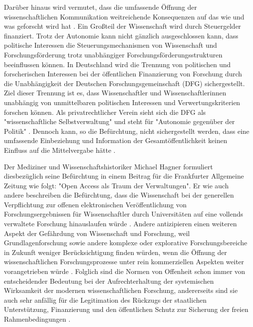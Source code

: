 Darüber hinaus wird vermutet, dass die umfassende Öffnung der wissenschaftlichen Kommunikation weitreichende Konsequenzen auf das wie und was geforscht wird hat \cite{Szczesny_2014} \cite{weingart_2005_wissenschaft}. Ein Großteil der Wissenschaft wird durch Steuergelder finanziert. Trotz der Autonomie kann nicht gänzlich ausgeschlossen kann, dass politische Interessen die Steuerungsmechanismen von Wissenschaft und Forschungsförderung trotz unabhängiger Forschungsförderungsstrukturen beeinflussen können. In Deutschland wird die Trennung von politischen und forscherischen Interessen bei der öffentlichen Finanzierung von Forschung durch die Unabhängigkeit der Deutschen Forschungsgemeinschaft (DFG) sichergestellt. Ziel dieser Trennung ist es, dass Wissenschaftler und Wissenschaftlerinnen unabhängig von unmittelbaren politischen Interessen und Verwertungskriterien forschen können. Als privatrechtlicher Verein sieht sich die DFG als "wissenschaftliche Selbstverwaltung" und steht für "Autonomie gegenüber der Politik" \cite{DFG_2011}. Dennoch kann, so die Befürchtung, nicht sichergestellt werden, dass eine umfassende Einbeziehung und Information der Gesamtöffentlichkeit keinen Einfluss auf die Mittelvergabe hätte \cite{weingart_2005_wissenschaft}.

Der Mediziner und Wissenschaftshistoriker Michael Hagner formuliert diesbezüglich seine Befürchtung in einem Beitrag für die Frankfurter Allgemeine Zeitung wie folgt: "Open Access als Traum der Verwaltungen". Er wie auch andere beschreiben die Befürchtung, dass die Wissenschaft bei der generellen Verpflichtung zur offenen elektronischen Veröffentlichung von Forschungsergebnissen für Wissenschaftler durch Universitäten auf eine vollends verwaltete Forschung hinauslaufen würde \cite{hagner_faz_2009}. Andere antizipieren einen weiteren Aspekt der Gefährdung von Wissenschaft und Forschung, weil Grundlagenforschung sowie andere komplexe oder explorative Forschungsbereiche in Zukunft weniger Berücksichtigung finden würden, wenn die Öffnung der wissenschaftlichen Forschungsprozesse unter rein kommerziellen Aspekten weiter vorangetrieben würde \cite{Szczesny_2014}. Folglich sind die Normen von Offenheit schon immer von entscheidender Bedeutung bei der Aufrechterhaltung der systemischen Wirksamkeit der modernen wissenschaftlichen Forschung, andererseits sind sie auch sehr anfällig für die Legitimation des Rückzugs der staatlichen Unterstützung, Finanzierung und den öffentlichen Schutz zur Sicherung der freien Rahmenbedingungen \cite{david1998_common}.

